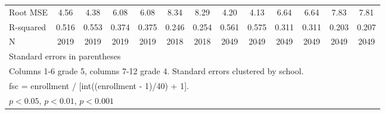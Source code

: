 {\begin{tabular}{l*{12}{c}}
\midrule
Root MSE    &        4.56         &        4.38         &        6.08         &        6.08         &        8.34         &        8.29         &        4.20         &        4.13         &        6.64         &        6.64         &        7.83         &        7.81         \\
R-squared   &       0.516         &       0.553         &       0.374         &       0.375         &       0.246         &       0.254         &       0.561         &       0.575         &       0.311         &       0.311         &       0.203         &       0.207         \\
N           &        2019         &        2019         &        2019         &        2019         &        2018         &        2018         &        2049         &        2049         &        2049         &        2049         &        2049         &        2049         \\
\bottomrule
\multicolumn{13}{l}{\footnotesize Standard errors in parentheses}\\
\multicolumn{13}{l}{\footnotesize Columns 1-6 grade 5, columns 7-12 grade 4. Standard errors clustered by school.}\\
\multicolumn{13}{l}{\footnotesize fsc = enrollment / [int((enrollment - 1)/40) + 1].}\\
\multicolumn{13}{l}{\footnotesize \sym{*} \(p<0.05\), \sym{**} \(p<0.01\), \sym{***} \(p<0.001\)}\\
\end{tabular}
}
